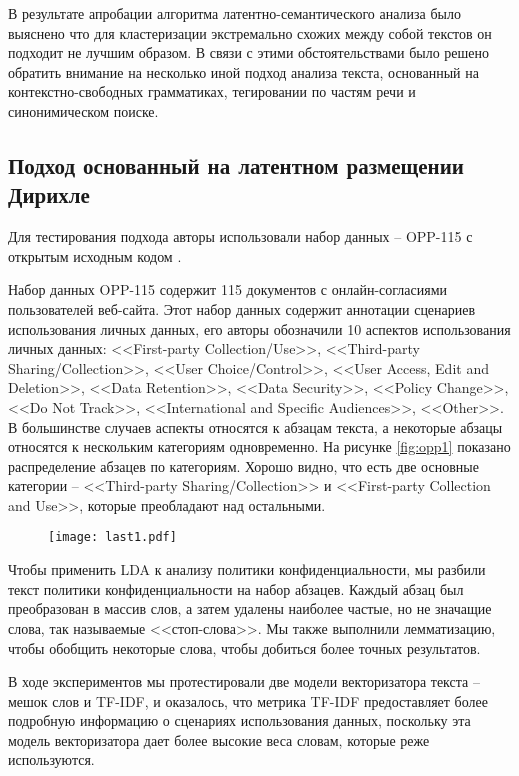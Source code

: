 \documentclass[../main]{subfiles}
\begin{document}
В результате апробации алгоритма латентно-семантического анализа было выяснено что для кластеризации экстремально схожих между собой текстов он  подходит не лучшим образом. В связи с этими обстоятельствами было решено обратить внимание на несколько иной подход анализа текста, основанный на контекстно-свободных грамматиках, тегировании по частям речи и синонимическом поиске.

\subsection{Подход основанный на латентном размещении Дирихле}
Для тестирования подхода авторы использовали набор данных -- OPP-115 с открытым исходным кодом \cite{MDPI18}.

Набор данных OPP-115 содержит 115 документов с онлайн-согласиями пользователей веб-сайта. Этот набор данных содержит аннотации сценариев использования личных данных, его авторы обозначили 10 аспектов использования личных данных: <<First-party Collection/Use>>, <<Third-party Sharing/Col\-lec\-ti\-on>>, <<User Choice/Control>>, <<User Access, Edit and Deletion>>, <<Data Re\-ten\-ti\-on>>, <<Data Security>>, <<Policy Change>>, <<Do Not Track>>, <<International and Specific Audiences>>, <<Other>>. В большинстве случаев аспекты относятся к абзацам текста, а некоторые абзацы относятся к нескольким категориям одновременно. На рисунке \ref{fig:opp1} показано распределение абзацев по категориям. Хорошо видно, что есть две основные категории – <<Third-party Sharing/Collection>> и <<First-party Collection and Use>>, которые преобладают над остальными.

\begin{figure}[H]
    \centering
    {\texttt{[image: last1.pdf]}}
    \vspace{-\baselineskip}
\end{figure}

Чтобы применить LDA к анализу политики конфиденциальности, мы разбили текст политики конфиденциальности на набор абзацев. Каждый абзац был преобразован в массив слов, а затем удалены наиболее частые, но не значащие слова, так называемые <<стоп-слова>>. Мы также выполнили лемматизацию, чтобы обобщить некоторые слова, чтобы добиться более точных результатов.

В ходе экспериментов мы протестировали две модели векторизатора текста – мешок слов и TF-IDF, и оказалось, что метрика TF-IDF предоставляет более подробную информацию о сценариях использования данных, поскольку эта модель векторизатора дает более высокие веса словам, которые реже используются.
\end{document}
